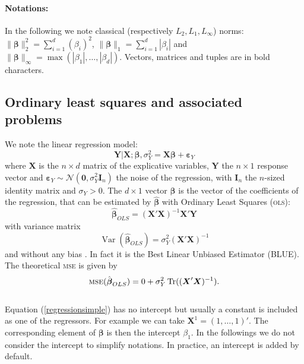 \documentclass[12pt,a4paper]{report}
\begin{document}
\paragraph{Notations:}	
In the following we note classical (respectively $L_2,L_1,L_{\infty}$) norms: $\parallel\boldsymbol{\beta}\parallel_2^2=\sum_{i=1}^d(\beta_i)^2$, $\parallel\boldsymbol{\beta} \parallel_1=\sum_{i=1}^d|\beta_i| $ and $\parallel\boldsymbol{\beta} \parallel_{\infty}=\operatorname{max}(|\beta_1|,\dots,|\beta_d|)$. Vectors, matrices and tuples are in bold characters.
	\subsection{Ordinary least squares and associated problems}\label{sectionOLS}		%

We note the linear regression model:
\begin{equation}
		\boldsymbol{Y}|\boldsymbol{X};\boldsymbol{\beta},\sigma^2_Y=\boldsymbol{X}\boldsymbol{\beta} + \boldsymbol{\varepsilon}_Y \label{regressionsimple}
	\end{equation}
	where $\boldsymbol{X}$ is the $n\times d$ matrix of the explicative variables, %
	 $\boldsymbol{Y}$ the  $n\times 1$ response vector and $\boldsymbol{\varepsilon}_Y \sim \mathcal{N}(\boldsymbol{0},\sigma_Y^2\boldsymbol{I}_n)$ the noise of the regression, with $\boldsymbol{I}_n$ the $n$-sized identity matrix and $\sigma_Y >0$. The $d\times 1$ vector $\boldsymbol{\beta}$ is the vector of the coefficients of the regression, that can be estimated by $\hat{\boldsymbol{\beta}}$ with Ordinary Least Squares (\textsc{ols}): %
	\begin{equation}
		\boldsymbol{\hat{\beta}}_{OLS}=\left(\boldsymbol{X}'\boldsymbol{X} \right) ^{-1}\boldsymbol{X}'\boldsymbol{Y}\label{betaOLS}
	\end{equation}
	with variance matrix
	\begin{equation}
		\operatorname{Var}(\hat{\boldsymbol{\beta}}_{OLS})=\sigma_Y^2\left(\boldsymbol{X}'\boldsymbol{X} \right) ^{-1} \label{eq:varOLS}
	\end{equation}
	and without any bias \cite{saporta2006probabilites,dodge2004analyse}. In fact it is the Best Linear Unbiased Estimator (BLUE).
	The theoretical \textsc{mse} is given by
	\begin{equation}
	\textsc{mse}(\hat{\boldsymbol{\beta}}_{OLS})= 0 + \sigma_Y^2 \operatorname{Tr}((\boldsymbol{X}'\boldsymbol{X})^{-1}). \nonumber 
	\end{equation}
	\\
	Equation (\ref{regressionsimple}) has no intercept but usually a constant is included as one of the regressors. For example we can take $\boldsymbol{X}^1=(1,\ldots,1)'$. The corresponding element of $\boldsymbol{\beta}$ is then the intercept $\beta_1$. In the followings we do not consider the intercept to simplify notations. In practice, an intercept is added by default.\\
	
\end{document}
